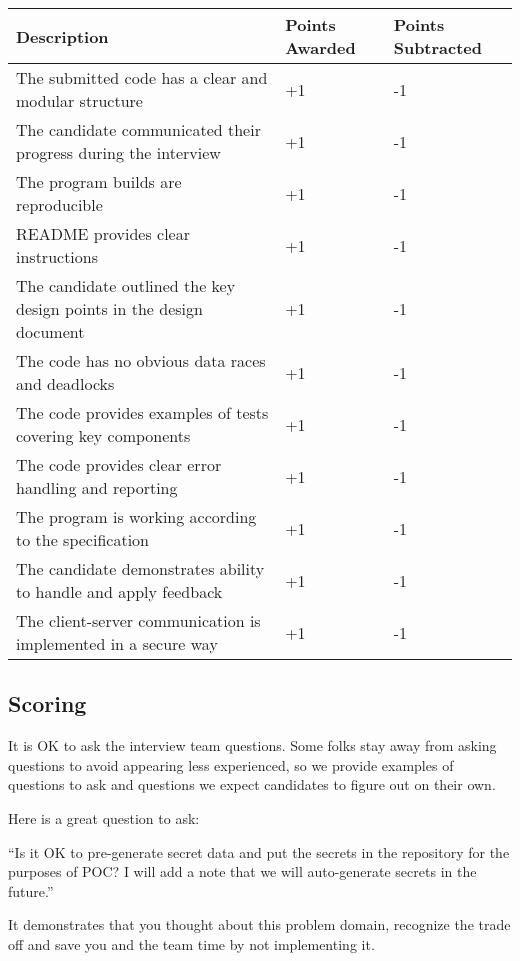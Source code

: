\documentclass{article}
\begin{document}
\begin{center}
\begin{tabular}{ | m{25em} | m{5em}| m{5em} | }
  \hline
  \rowcolor{blue!60!black!10}
  Description & Points Awarded & Points Subtracted \\
  \hline
  The submitted code has a clear and modular structure & +1 & -1 \\
  \hline   
  The candidate communicated their progress during the interview & +1 & -1 \\
  \hline
  The program builds are reproducible & +1 & -1 \\
  \hline
  README provides clear instructions & +1 & -1 \\
  \hline
  The candidate outlined the key design points in the design document & +1 & -1 \\
  \hline
  The code has no obvious data races and deadlocks & +1 & -1 \\
  \hline
  The code provides examples of tests covering key components & +1 & -1 \\
  \hline
  The code provides clear error handling and reporting & +1 & -1 \\
  \hline
  The program is working according to the specification & +1 & -1 \\
  \hline
  The candidate demonstrates ability to handle and apply feedback & +1 & -1 \\
  \hline
  The client-server communication is implemented in a secure way & +1 & -1 \\
  \hline
\end{tabular}
\end{center}

\subsection{Scoring}

It is OK to ask the interview team questions. Some folks stay away from
asking questions to avoid appearing less experienced, so we provide examples of questions
to ask and questions we expect candidates to figure out on their own.

Here is a great question to ask:

``Is it OK to pre-generate secret data and put the secrets in the repository for the purposes of POC? I will add a note that we will auto-generate secrets in the future.''

It demonstrates that you thought about this problem domain, recognize the trade off and save you and the team time by not implementing it.
\end{document}

